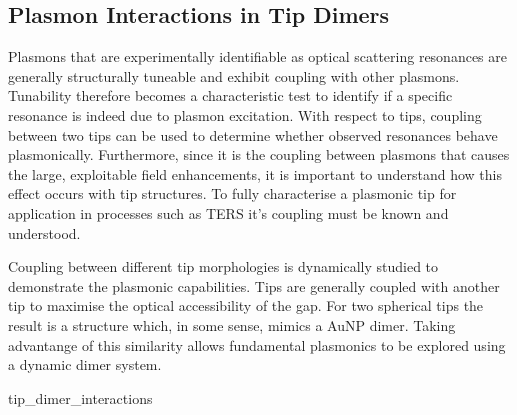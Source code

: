 \documentclass[12pt, a4paper, twoside]{book}
\begin{document}
\begin{singlespace}
{\color{white}
\chapter{Plasmon Interactions in Tip Dimers}}
\end{singlespace}


Plasmons that are experimentally identifiable as optical scattering resonances are generally structurally tuneable and exhibit coupling with other plasmons. Tunability therefore becomes a characteristic test to identify if a specific resonance is indeed due to plasmon excitation. With respect to tips, coupling between two tips can be used to determine whether observed resonances behave plasmonically.
Furthermore, since it is the coupling between plasmons that causes the large, exploitable field enhancements, it is important to understand how this effect occurs with tip structures. To fully characterise a plasmonic tip for application in processes such as TERS it's coupling must be known and understood.

Coupling between different tip morphologies is dynamically studied to demonstrate the plasmonic capabilities. Tips are generally coupled with another tip to maximise the optical accessibility of the gap. For two spherical tips the result is a structure which, in some sense, mimics a AuNP dimer. Taking advantange of this similarity allows fundamental plasmonics to be explored using a dynamic dimer system.

{tip_dimer_interactions}
\end{document}
